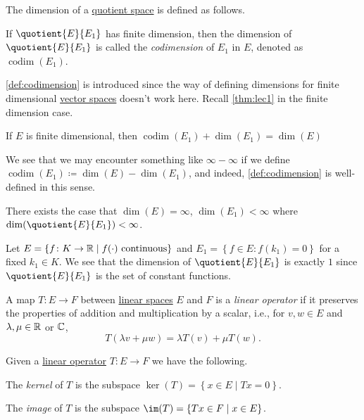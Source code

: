 The dimension of a \hyperref[def:quotient-space]{quotient space} is defined as follows.

\begin{definition}[Codimension]\label{def:codimension}
	If \(\quotient{E}{E_1} \) has finite dimension, then the dimension of \(\quotient{E}{E_1} \) is called the \emph{codimension} of \(E_1\) in \(E\), denoted as \(\mathop{\mathrm{codim}}(E_1)\).
\end{definition}

\autoref{def:codimension} is introduced since the way of defining dimensions for finite dimensional \hyperref[def:linear-vector-space]{vector spaces} doesn't work here. Recall \autoref{thm:lec1} in the finite dimension case.

\begin{theorem}\label{thm:lec1}
	If \(E\) is finite dimensional, then \(\mathop{\mathrm{codim}}(E_1) + \dim (E_1) = \dim(E)\)
\end{theorem}

We see that we may encounter something like \(\infty - \infty \) if we define \(\mathop{\mathrm{codim}}(E_1) \coloneqq \dim(E) - \dim(E_1)\), and indeed, \autoref{def:codimension} is well-defined in this sense.

\begin{eg}
	There exists the case that \(\dim(E) = \infty \), \(\dim(E_1) < \infty\) where \(\dim(\quotient{E}{E_1} )<\infty \).
\end{eg}
\begin{explanation}
	Let \(E = \left\{ f\colon K\to \mathbb{\MakeUppercase{r}} \mid f(\cdot) \text{ continuous}  \right\} \) and \(E_1 = \left\{ f\in E\colon f(k_1) = 0 \right\} \) for a fixed \(k_1\in K\). We see that the dimension of \(\quotient{E}{E_1} \) is exactly \(1\) since \(\quotient{E}{E_1} \) is the set of constant functions.
\end{explanation}

\begin{definition}\label{def:linear-op}
	A map \(T\colon E\to F\) between \hyperref[def:linear-vector-space]{linear spaces} \(E\) and \(F\) is a \emph{linear operator} if it preserves the properties of addition and multiplication by a scalar, i.e., for \(v, w\in E\) and \(\lambda , \mu \in \mathbb{\MakeUppercase{r}}\) or \(\mathbb{\MakeUppercase{c}}\),
	\[
		T(\lambda v + \mu w) = \lambda T(v) + \mu T(w).
	\]
\end{definition}

\begin{definition*}
	Given a \hyperref[def:linear-op]{linear operator} \(T\colon E \to F\) we have the following.
	\begin{definition}[Kernel]
		The \emph{kernel} of \(T\) is the subspace \(\ker(T) = \left\{ x\in E\mid Tx=0 \right\} \).
	\end{definition}

	\begin{definition}[Image]
		The \emph{image} of \(T\) is the subspace \(\im(T) = \left\{ Tx\in F\mid x\in E \right\} \).
	\end{definition}
\end{definition*}

